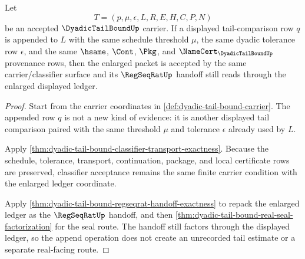 \begin{theorem}
\label{thm:dyadic-tail-bound-ledger-append-stability}
Let
$$
T=(p,\mu,\epsilon,L,R,E,H,C,P,N)
$$
be an accepted $\DyadicTailBoundUp$ carrier. If a displayed tail-comparison row $q$ is appended to $L$ with the same schedule threshold $\mu$, the same dyadic tolerance row $\epsilon$, and the same $\hsame$, $\Cont$, $\Pkg$, and $\NameCert_{\DyadicTailBoundUp}$ provenance rows, then the enlarged packet is accepted by the same carrier/classifier surface and its $\RegSeqRatUp$ handoff still reads through the enlarged displayed ledger.
\end{theorem}
\begin{proof}
Start from the carrier coordinates in \autoref{def:dyadic-tail-bound-carrier}. The appended row $q$ is not a new kind of evidence: it is another displayed tail comparison paired with the same threshold $\mu$ and tolerance $\epsilon$ already used by $L$.

Apply \autoref{thm:dyadic-tail-bound-classifier-transport-exactness}. Because the schedule, tolerance, transport, continuation, package, and local certificate rows are preserved, classifier acceptance remains the same finite carrier condition with the enlarged ledger coordinate.

Apply \autoref{thm:dyadic-tail-bound-regseqrat-handoff-exactness} to repack the enlarged ledger as the $\RegSeqRatUp$ handoff, and then \autoref{thm:dyadic-tail-bound-real-seal-factorization} for the seal route. The handoff still factors through the displayed ledger, so the append operation does not create an unrecorded tail estimate or a separate real-facing route.
\end{proof}

